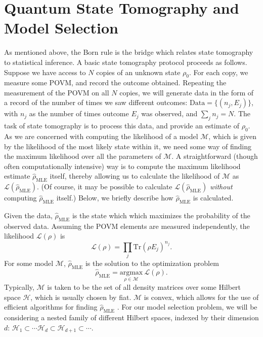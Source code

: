\documentclass[aps,pra, twocolumn]{revtex4-1}
\newcommand{\M}{\mathcal{M}}
\newcommand{\cH}{\mathcal{H}}
\newcommand{\rhohat}{\hat{\rho}}
\newcommand{\rhoMLE}{\rhohat_{\scriptscriptstyle\mathrm{MLE}}}
\begin{document}
\section{Quantum State Tomography and Model Selection}
As mentioned above, the Born rule is the bridge which relates state tomography to statistical inference. A basic state tomography protocol proceeds as follows. Suppose we have access to $N$ copies of an unknown state $\rho_{0}$. For each copy, we measure some POVM, and record the outcome obtained. Repeating the measurement of the POVM on all $N$ copies, we will generate data in the form of a record of the number of times we saw different outcomes: $\mathrm{Data} = \{(n_{j}, E_{j})\}$, with $n_{j}$ as the number of times outcome $E_{j}$ was observed, and $\sum_{j}n_{j} = N$. The task of state tomography is to process this data, and provide an estimate of $\rho_{0}$. As we are concerned with computing the likelihood of a model $\M$, which is given by the likelihood of the most likely state within it, we need some way of finding the maximum likelihood over all the parameters of $\M$. A straightforward (though often computationally intensive) way is to compute the maximum likelihood estimate $\rhoMLE$ itself, thereby allowing us to calculate the likelihood of $\M$ as $\mathcal{L}(\rhoMLE)$. (Of course, it may be possible to calculate $\mathcal{L}(\rhoMLE)$ \emph{without} computing $\rhoMLE$ itself.) Below, we briefly describe how $\rhoMLE$ is calculated.

Given the data, $\rhoMLE$ is the state which which maximizes the probability of the observed data. Assuming the POVM elements are measured independently, the likelihood $\mathcal{L}(\rho)$ is
\begin{equation}
\mathcal{L}(\rho) = \prod_{j}\mathrm{Tr}(\rho E_{j})^{n_{j}}.
\end{equation}
For some model $\M$, $\rhoMLE$ is the solution to the optimization problem
\begin{equation}
\rhoMLE = \underset{\rho \in \M}{\text{argmax}}~\mathcal{L}(\rho).
\end{equation}
Typically, $\M$ is taken to be the set of all density matrices over some Hilbert space $\cH$, which is usually chosen by fiat. $\M$ is convex, which allows for the use of efficient algorithms for finding $\rhoMLE$ \cite{Boyd}. For our model selection problem, we will be considering a nested family of different Hilbert spaces, indexed by their dimension $d$: $\cH_{1}  \subset \cdots \cH_{d} \subset \cH_{d+1} \subset \cdots$.
\end{document}
